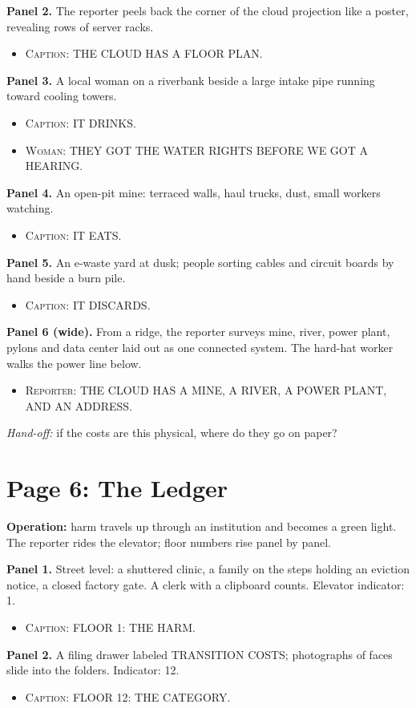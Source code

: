 \documentclass[11pt]{article}
\newcommand{\op}[1]{\textbf{Operation:} #1\par}
\newcommand{\panel}[2]{\textbf{#1.} #2\par}
\newenvironment{lines}{\begin{itemize}[label={},leftmargin=1.5em,itemsep=0.05em,topsep=0.1em]}{\end{itemize}}
\newcommand{\say}[2]{\item \textsc{#1}: \textsf{\small #2}}
\newcommand{\handoff}[1]{\emph{Hand-off:} #1\par}
\begin{document}
\panel{Panel 2}{The reporter peels back the corner of the cloud projection like a poster, revealing rows of server racks.}
\begin{lines}\say{Caption}{THE CLOUD HAS A FLOOR PLAN.}\end{lines}

\panel{Panel 3}{A local woman on a riverbank beside a large intake pipe running toward cooling towers.}
\begin{lines}\say{Caption}{IT DRINKS.}\say{Woman}{THEY GOT THE WATER RIGHTS BEFORE WE GOT A HEARING.}\end{lines}

\panel{Panel 4}{An open-pit mine: terraced walls, haul trucks, dust, small workers watching.}
\begin{lines}\say{Caption}{IT EATS.}\end{lines}

\panel{Panel 5}{An e-waste yard at dusk; people sorting cables and circuit boards by hand beside a burn pile.}
\begin{lines}\say{Caption}{IT DISCARDS.}\end{lines}

\panel{Panel 6 (wide)}{From a ridge, the reporter surveys mine, river, power plant, pylons and data center laid out as one connected system. The hard-hat worker walks the power line below.}
\begin{lines}\say{Reporter}{THE CLOUD HAS A MINE, A RIVER, A POWER PLANT, AND AN ADDRESS.}\end{lines}

\handoff{if the costs are this physical, where do they go on paper?}

\section{Page 6: The Ledger}

\op{harm travels up through an institution and becomes a green light. The reporter rides the elevator; floor numbers rise panel by panel.}

\panel{Panel 1}{Street level: a shuttered clinic, a family on the steps holding an eviction notice, a closed factory gate. A clerk with a clipboard counts. Elevator indicator: 1.}
\begin{lines}\say{Caption}{FLOOR 1: THE HARM.}\end{lines}

\panel{Panel 2}{A filing drawer labeled \textsf{\small TRANSITION COSTS}; photographs of faces slide into the folders. Indicator: 12.}
\begin{lines}\say{Caption}{FLOOR 12: THE CATEGORY.}\end{lines}
\end{document}
